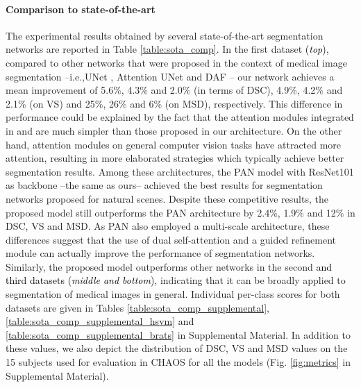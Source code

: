 \documentclass[journal]{IEEEtran}
\begin{document}
\paragraph*{\textbf{Comparison to state-of-the-art}}

The experimental results obtained by several state-of-the-art segmentation networks are reported in Table \ref{table:sota_comp}. In the first dataset \textcolor{black}{(\textit{top})}, compared to other networks that were proposed in the context of medical image segmentation --i.e.,UNet \cite{ronneberger2015u}, Attention UNet \cite{schlemper2019attention} and DAF \cite{wang18d}-- our network achieves a mean improvement of 5.6\%, 4.3\% and 2.0\% (in terms of DSC), 4.9\%, 4.2\% and 2.1\% (on VS) and 25\%, 26\% and 6\% (on MSD), respectively. This difference in performance could be explained by the fact that the attention modules integrated in \cite{wang18d} and \cite{schlemper2019attention} are much simpler than those proposed in our architecture. On the other hand, attention modules on general computer vision tasks have attracted more attention, resulting in more elaborated strategies which typically achieve better segmentation results. Among these architectures, the PAN model \cite{li2018pyramid} with ResNet101 as backbone --the same as ours-- achieved the best results for segmentation networks proposed for natural scenes. Despite these competitive results, the proposed model still outperforms the PAN architecture by 2.4\%, 1.9\% and 12\% in DSC, VS and MSD. As PAN \cite{li2018pyramid} also employed a multi-scale architecture, these differences suggest that the use of dual self-attention and a guided refinement module can actually improve the performance of segmentation networks. Similarly, the proposed model outperforms other networks in the second \textcolor{black}{and third datasets \textcolor{black}{(\textit{middle and bottom})}}, indicating that it can be broadly applied to segmentation of medical images in general. Individual per-class scores for both datasets are given in Tables \ref{table:sota_comp_supplemental}, \ref{table:sota_comp_supplemental_hsvm} \textcolor{black}{and \ref{table:sota_comp_supplemental_brats}} in Supplemental Material. In addition to these values, we also depict the distribution of DSC, VS and MSD values on the 15 subjects used for evaluation in CHAOS for all the models (Fig. \ref{fig:metrics} in Supplemental Material).
\end{document}
